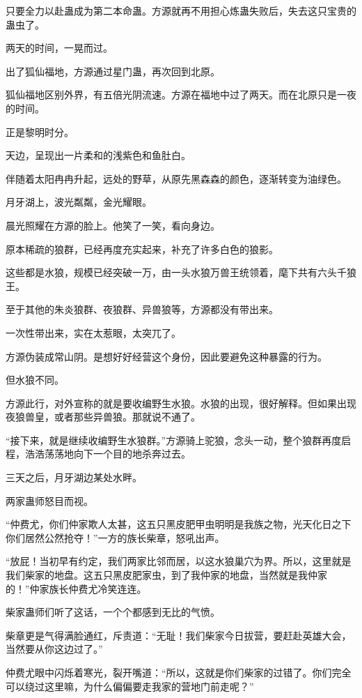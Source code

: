 \begin{this_body}
只要全力以赴蛊成为第二本命蛊。方源就再不用担心炼蛊失败后，失去这只宝贵的蛊虫了。

两天的时间，一晃而过。

出了狐仙福地，方源通过星门蛊，再次回到北原。

狐仙福地区别外界，有五倍光阴流速。方源在福地中过了两天。而在北原只是一夜的时间。

正是黎明时分。

天边，呈现出一片柔和的浅紫色和鱼肚白。

伴随着太阳冉冉升起，远处的野草，从原先黑森森的颜色，逐渐转变为油绿色。

月牙湖上，波光粼粼，金光耀眼。

晨光照耀在方源的脸上。他笑了一笑，看向身边。

原本稀疏的狼群，已经再度充实起来，补充了许多白色的狼影。

这些都是水狼，规模已经突破一万，由一头水狼万兽王统领着，麾下共有六头千狼王。

至于其他的朱炎狼群、夜狼群、异兽狼等，方源都没有带出来。

一次性带出来，实在太惹眼，太突兀了。

方源伪装成常山阴。是想好好经营这个身份，因此要避免这种暴露的行为。

但水狼不同。

方源此行，对外宣称的就是要收编野生水狼。水狼的出现，很好解释。但如果出现夜狼兽皇，或者那些异兽狼。那就说不通了。

“接下来，就是继续收编野生水狼群。”方源骑上驼狼，念头一动，整个狼群再度启程，浩浩荡荡地向下一个目的地杀奔过去。

三天之后，月牙湖边某处水畔。

两家蛊师怒目而视。

“仲费尤，你们仲家欺人太甚，这五只黑皮肥甲虫明明是我族之物，光天化日之下你们居然公然抢夺！”一方的族长柴章，怒吼出声。

“放屁！当初早有约定，我们两家比邻而居，以这水狼巢穴为界。所以，这里就是我们柴家的地盘。这五只黑皮肥家虫，到了我仲家的地盘，当然就是我仲家的！”仲家族长仲费尤冷笑连连。

柴家蛊师们听了这话，一个个都感到无比的气愤。

柴章更是气得满脸通红，斥责道：“无耻！我们柴家今日拔营，要赶赴英雄大会，当然要从你这边过了。”

仲费尤眼中闪烁着寒光，裂开嘴道：“所以，这就是你们柴家的过错了。你们完全可以绕过这里嘛，为什么偏偏要走我家的营地门前走呢？”


\end{this_body}
